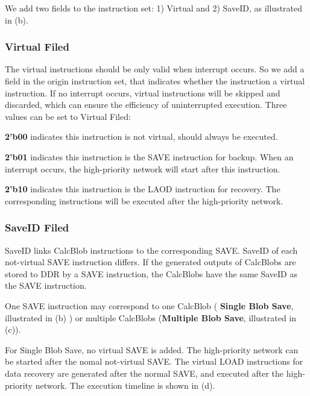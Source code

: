 We add two fields to the instruction set: 1) Virtual and 2) SaveID, as illustrated in (b). 

\subsubsection{ Virtual Filed}

The virtual instructions should be only valid when interrupt occurs. So we add a field in the origin instruction set, that indicates whether the instruction a virtual instruction. If no interrupt occurs, virtual instructions will be skipped and discarded, which can ensure the efficiency of uninterrupted execution. Three values can be set to Virtual Filed:

	\textbf{2'b00} indicates this instruction is not virtual, should always be executed.
	
	\textbf{2'b01} indicates this instruction is the SAVE instruction for backup. When an interrupt occurs, the high-priority network will start after this instruction.
	
	\textbf{2'b10} indicates this instruction is the LAOD instruction for recovery. The corresponding instructions will be executed after the high-priority network.

\subsubsection{ SaveID Filed }

SaveID links CalcBlob instructions to the corresponding SAVE. SaveID of each not-virtual SAVE instruction differs. If the generated outputs of CalcBlobs are stored to DDR by a SAVE instruction, the CalcBlobs have the same SaveID as the SAVE instruction.

One SAVE instruction may correspond to one CalcBlob ( \textbf{Single Blob Save}, illustrated in (b) ) or multiple CalcBlobs (\textbf{Multiple Blob Save}, illustrated in (c)).

For Single Blob Save, no virtual SAVE is added. The high-priority network can be started after the nomal not-virtual SAVE. The virtual LOAD instructions for data recovery are generated after the normal SAVE, and executed after the high-priority network. The execution timeline is shown in (d).

